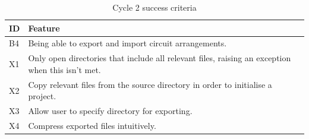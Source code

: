 \documentclass[11pt]{article}
\begin{document}
        \newpage
        \begin{table}[!h]
            \centering
            \begin{tabular}{@{}lp{425pt}@{}}\toprule
                \textbf{ID} & \textbf{Feature} \\ \midrule
                B4 & Being able to export and import circuit arrangements. \\ 
                X1 & Only open directories that include all relevant files, raising an exception when this isn't met. \\ 
                X2 & Copy relevant files from the source directory in order to initialise a project. \\ 
                X3 & Allow user to specify directory for exporting. \\ 
                X4 & Compress exported files intuitively. \\
                \bottomrule
            \end{tabular}
            \caption{Cycle 2 success criteria}
            \label{tbl:succ_crit_c2}
        \end{table}
\end{document}

